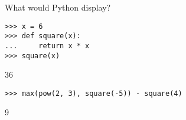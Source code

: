 
\question What would Python display?

\begin{blocksection}
\begin{lstlisting}
>>> x = 6
>>> def square(x):
...     return x * x
>>> square(x)
\end{lstlisting}
\begin{solution}[0.3in]
36
\end{solution}

\begin{lstlisting}
>>> max(pow(2, 3), square(-5)) - square(4)
\end{lstlisting}
\begin{solution}[0.3in]
9
\end{solution}
\end{blocksection}
